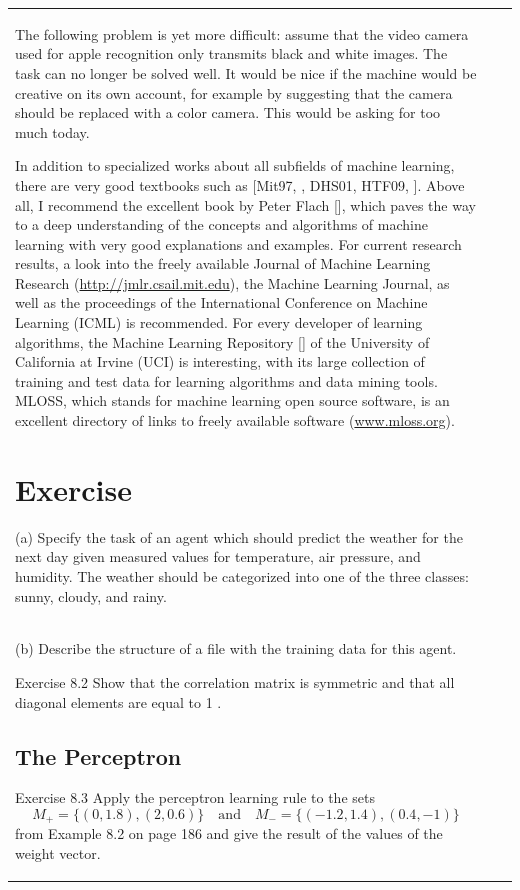 \documentclass[10pt]{book}
\begin{document}
\begin{center}
\begin{tabular}{|l|l|l|}
The following problem is yet more difficult: assume that the video camera used for apple recognition only transmits black and white images. The task can no longer be solved well. It would be nice if the machine would be creative on its own account, for example by suggesting that the camera should be replaced with a color camera. This would be asking for too much today.

In addition to specialized works about all subfields of machine learning, there are very good textbooks such as [Mit97, \cite{bis06}, DHS01, HTF09, \cite{alp04}]. Above all, I recommend the excellent book by Peter Flach [\cite{fla12}], which paves the way to a deep understanding of the concepts and algorithms of machine learning with very good explanations and examples. For current research results, a look into the freely available Journal of Machine Learning Research (\href{http://jmlr.csail.mit.edu}{http://jmlr.csail.mit.edu}), the Machine Learning Journal, as well as the proceedings of the International Conference on Machine Learning (ICML) is recommended. For every developer of learning algorithms, the Machine Learning Repository [\cite{dnm98}] of the University of California at Irvine (UCI) is interesting, with its large collection of training and test data for learning algorithms and data mining tools. MLOSS, which stands for machine learning open source software, is an excellent directory of links to freely available software (\href{http://www.mloss.org}{www.mloss.org}).

\section{Exercise}
(a) Specify the task of an agent which should predict the weather for the next day given measured values for temperature, air pressure, and humidity. The weather should be categorized into one of the three classes: sunny, cloudy, and rainy.\\
(b) Describe the structure of a file with the training data for this agent.

Exercise 8.2 Show that the correlation matrix is symmetric and that all diagonal elements are equal to 1 .

\subsection{The Perceptron}
Exercise 8.3 Apply the perceptron learning rule to the sets
$$
M_{+}=\{(0,1.8),(2,0.6)\} \quad \text{and} \quad M_{-}=\{(-1.2,1.4),(0.4,-1)\}
$$
from Example 8.2 on page 186 and give the result of the values of the weight vector.


\end{tabular}
\end{center}
\end{document}
